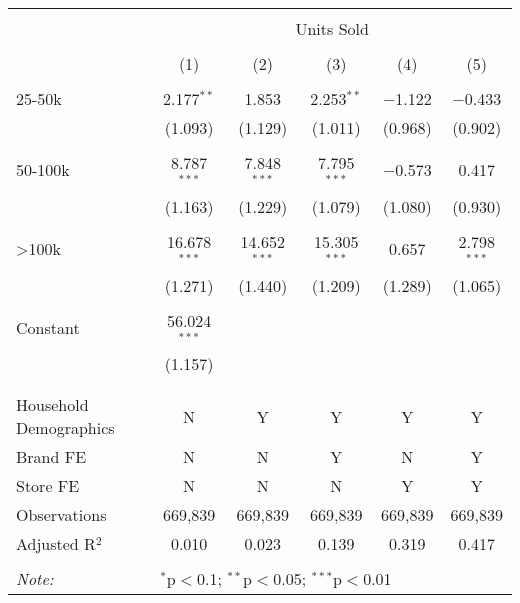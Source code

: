
\begin{table}[!htbp] \centering 
  \caption{} 
  \label{} 
\begin{tabular}{@{\extracolsep{5pt}}lccccc} 
\\[-1.8ex]\hline 
\hline \\[-1.8ex] 
 & \multicolumn{5}{c}{Units Sold} \\ 
\cline{2-6} 
\\[-1.8ex] & (1) & (2) & (3) & (4) & (5)\\ 
\hline \\[-1.8ex] 
 25-50k & 2.177$^{**}$ & 1.853 & 2.253$^{**}$ & $-$1.122 & $-$0.433 \\ 
  & (1.093) & (1.129) & (1.011) & (0.968) & (0.902) \\ 
  & & & & & \\ 
 50-100k & 8.787$^{***}$ & 7.848$^{***}$ & 7.795$^{***}$ & $-$0.573 & 0.417 \\ 
  & (1.163) & (1.229) & (1.079) & (1.080) & (0.930) \\ 
  & & & & & \\ 
 >100k & 16.678$^{***}$ & 14.652$^{***}$ & 15.305$^{***}$ & 0.657 & 2.798$^{***}$ \\ 
  & (1.271) & (1.440) & (1.209) & (1.289) & (1.065) \\ 
  & & & & & \\ 
 Constant & 56.024$^{***}$ &  &  &  &  \\ 
  & (1.157) &  &  &  &  \\ 
  & & & & & \\ 
\hline \\[-1.8ex] 
Household Demographics & N & Y & Y & Y & Y \\ 
Brand FE & N & N & Y & N & Y \\ 
Store FE & N & N & N & Y & Y \\ 
Observations & 669,839 & 669,839 & 669,839 & 669,839 & 669,839 \\ 
Adjusted R$^{2}$ & 0.010 & 0.023 & 0.139 & 0.319 & 0.417 \\ 
\hline 
\hline \\[-1.8ex] 
\textit{Note:}  & \multicolumn{5}{l}{$^{*}$p$<$0.1; $^{**}$p$<$0.05; $^{***}$p$<$0.01} \\ 
\end{tabular} 
\end{table} 
